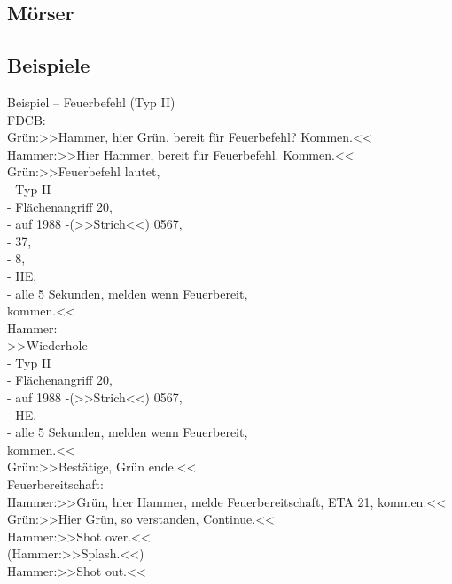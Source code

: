 \subsection{Mörser}

\subsection{Beispiele}
	Beispiel – Feuerbefehl (Typ II) \\

	FDCB: \\
	 Grün:>>Hammer, hier Grün, bereit für Feuerbefehl? Kommen.<< \\
	 Hammer:>>Hier Hammer, bereit für Feuerbefehl. Kommen.<< \\
	 Grün:>>Feuerbefehl lautet,  \\
	 - Typ II \\
	 - Flächenangriff 20, \\
	 - auf 1988 -(>>Strich<<) 0567, \\
	 - 37, \\
	 - 8, \\
	 - HE, \\
	 - alle 5 Sekunden, melden wenn Feuerbereit, \\
	 kommen.<< \\


	Hammer:   \\
	 >>Wiederhole  \\
	 - Typ II  \\
	 - Flächenangriff 20,  \\
	 - auf 1988 -(>>Strich<<) 0567,  \\
	 - HE,  \\
	 - alle 5 Sekunden, melden wenn Feuerbereit,  \\
	 kommen.<<  \\
	 Grün:>>Bestätige, Grün ende.<<  \\
	 Feuerbereitschaft:  \\
	 Hammer:>>Grün, hier Hammer, melde Feuerbereitschaft, ETA 21, kommen.<<  \\
	 Grün:>>Hier Grün, so verstanden, Continue.<<  \\
	 Hammer:>>Shot over.<<  \\
	 (Hammer:>>Splash.<<)  \\
	 Hammer:>>Shot out.<<  \\



